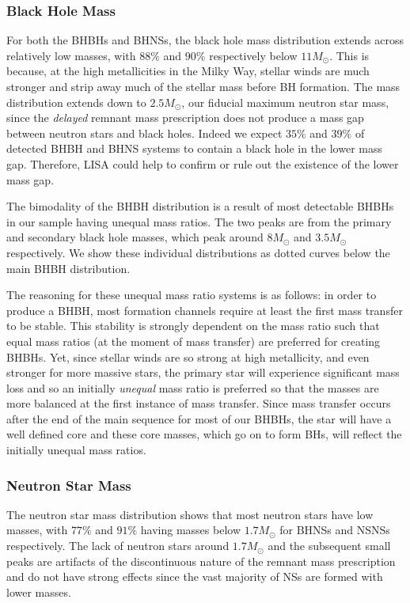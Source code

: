 \subsubsection{Black Hole Mass}
For both the BHBHs and BHNSs, the black hole mass distribution extends across relatively low masses, with $88\%$ and $90\%$ respectively below $11 \unit{M_{\odot}}$. This is because, at the high metallicities in the Milky Way, stellar winds are much stronger and strip away much of the stellar mass before BH formation. The mass distribution extends down to $2.5 \unit{M_{\odot}}$, our fiducial maximum neutron star mass, since the \citet{Fryer+2012} \textit{delayed} remnant mass prescription does not produce a mass gap between neutron stars and black holes. Indeed we expect $35\%$ and $39\%$ of detected BHBH and BHNS systems to contain a black hole in the lower mass gap. Therefore, LISA could help to confirm or rule out the existence of the lower mass gap.

The bimodality of the BHBH distribution is a result of most detectable BHBHs in our sample having unequal mass ratios. The two peaks are from the primary and secondary black hole masses, which peak around $8 \unit{M_{\odot}}$ and $3.5 \unit{M_{\odot}}$ respectively. We show these individual distributions as dotted curves below the main BHBH distribution.

The reasoning for these unequal mass ratio systems is as follows: in order to produce a BHBH, most formation channels require at least the first mass transfer to be stable. This stability is strongly dependent on the mass ratio such that equal mass ratios (at the moment of mass transfer) are preferred for creating BHBHs. Yet, since stellar winds are so strong at high metallicity, and even stronger for more massive stars, the primary star will experience significant mass loss and so an initially \textit{unequal} mass ratio is preferred so that the masses are more balanced at the first instance of mass transfer. Since mass transfer occurs after the end of the main sequence for most of our BHBHs, the star will have a well defined core and these core masses, which go on to form BHs, will reflect the initially unequal mass ratios.

\subsubsection{Neutron Star Mass}
The neutron star mass distribution shows that most neutron stars have low masses, with $77\%$ and $91\%$ having masses below $1.7 \unit{M_{\odot}}$ for BHNSs and NSNSs respectively. The lack of neutron stars around $1.7 \unit{M_{\odot}}$ and the subsequent small peaks are artifacts of the discontinuous nature of the \citet{Fryer+2012} remnant mass prescription and do not have strong effects since the vast majority of NSs are formed with lower masses.

